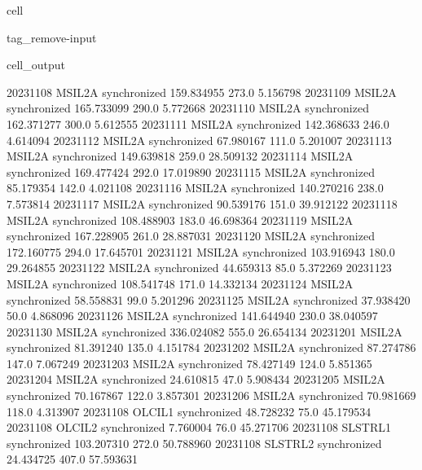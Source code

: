 \documentclass[letterpaper,10pt,english]{jupyterBook}
\begin{document}
\begin{sphinxuseclass}{cell}
\begin{sphinxuseclass}{tag_remove-input}
\begin{sphinxVerbatimOutput}
\begin{sphinxuseclass}{cell_output}
\begin{sphinxVerbatim}[commandchars=\\\{\}]
2023\PYGZhy{}11\PYGZhy{}08       MSIL2A  synchronized  159.834955   273.0    5.156798
2023\PYGZhy{}11\PYGZhy{}09       MSIL2A  synchronized  165.733099   290.0    5.772668
2023\PYGZhy{}11\PYGZhy{}10       MSIL2A  synchronized  162.371277   300.0    5.612555
2023\PYGZhy{}11\PYGZhy{}11       MSIL2A  synchronized  142.368633   246.0    4.614094
2023\PYGZhy{}11\PYGZhy{}12       MSIL2A  synchronized   67.980167   111.0    5.201007
2023\PYGZhy{}11\PYGZhy{}13       MSIL2A  synchronized  149.639818   259.0   28.509132
2023\PYGZhy{}11\PYGZhy{}14       MSIL2A  synchronized  169.477424   292.0   17.019890
2023\PYGZhy{}11\PYGZhy{}15       MSIL2A  synchronized   85.179354   142.0    4.021108
2023\PYGZhy{}11\PYGZhy{}16       MSIL2A  synchronized  140.270216   238.0    7.573814
2023\PYGZhy{}11\PYGZhy{}17       MSIL2A  synchronized   90.539176   151.0   39.912122
2023\PYGZhy{}11\PYGZhy{}18       MSIL2A  synchronized  108.488903   183.0   46.698364
2023\PYGZhy{}11\PYGZhy{}19       MSIL2A  synchronized  167.228905   261.0   28.887031
2023\PYGZhy{}11\PYGZhy{}20       MSIL2A  synchronized  172.160775   294.0   17.645701
2023\PYGZhy{}11\PYGZhy{}21       MSIL2A  synchronized  103.916943   180.0   29.264855
2023\PYGZhy{}11\PYGZhy{}22       MSIL2A  synchronized   44.659313    85.0    5.372269
2023\PYGZhy{}11\PYGZhy{}23       MSIL2A  synchronized  108.541748   171.0   14.332134
2023\PYGZhy{}11\PYGZhy{}24       MSIL2A  synchronized   58.558831    99.0    5.201296
2023\PYGZhy{}11\PYGZhy{}25       MSIL2A  synchronized   37.938420    50.0    4.868096
2023\PYGZhy{}11\PYGZhy{}26       MSIL2A  synchronized  141.644940   230.0   38.040597
2023\PYGZhy{}11\PYGZhy{}30       MSIL2A  synchronized  336.024082   555.0   26.654134
2023\PYGZhy{}12\PYGZhy{}01       MSIL2A  synchronized   81.391240   135.0    4.151784
2023\PYGZhy{}12\PYGZhy{}02       MSIL2A  synchronized   87.274786   147.0    7.067249
2023\PYGZhy{}12\PYGZhy{}03       MSIL2A  synchronized   78.427149   124.0    5.851365
2023\PYGZhy{}12\PYGZhy{}04       MSIL2A  synchronized   24.610815    47.0    5.908434
2023\PYGZhy{}12\PYGZhy{}05       MSIL2A  synchronized   70.167867   122.0    3.857301
2023\PYGZhy{}12\PYGZhy{}06       MSIL2A  synchronized   70.981669   118.0    4.313907
2023\PYGZhy{}11\PYGZhy{}08      OLCI\PYGZus{}L1  synchronized   48.728232    75.0   45.179534
2023\PYGZhy{}11\PYGZhy{}08      OLCI\PYGZus{}L2  synchronized    7.760004    76.0   45.271706
2023\PYGZhy{}11\PYGZhy{}08     SLSTR\PYGZus{}L1  synchronized  103.207310   272.0   50.788960
2023\PYGZhy{}11\PYGZhy{}08     SLSTR\PYGZus{}L2  synchronized   24.434725   407.0   57.593631

\end{sphinxVerbatim}
\end{sphinxuseclass}
\end{sphinxVerbatimOutput}
\end{sphinxuseclass}
\end{sphinxuseclass}
\end{document}
